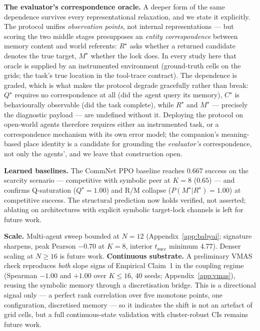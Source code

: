 \documentclass{article}
\begin{document}
\textbf{The evaluator's correspondence oracle.} A deeper form of the
same dependence survives every representational relaxation, and we
state it explicitly. The protocol unifies \emph{observation points},
not internal representations --- but scoring the two middle stages
presupposes an \emph{entity correspondence} between memory content and
world referents: $R^\star$ asks whether a returned candidate denotes
the true target, $M^\star$ whether the lock does. In every study here
that oracle is supplied by an instrumented environment (ground-truth
cells on the grids; the task's true location in the tool-trace
contract). The dependence is graded, which is what makes the protocol
degrade gracefully rather than break: $Q^\star$ requires no
correspondence at all (did the agent query its memory), $C^\star$ is
behaviourally observable (did the task complete), while $R^\star$ and
$M^\star$ --- precisely the diagnostic payload --- are undefined
without it. Deploying the protocol on open-world agents therefore
requires either an instrumented task, or a correspondence mechanism
with its own error model; the companion's meaning-based place identity
is a candidate for grounding the \emph{evaluator's} correspondence,
not only the agents', and we leave that construction open.

\textbf{Learned baselines.} The CommNet PPO baseline reaches $0.667$ success on the scarcity scenario --- competitive with symbolic peer at $K{=}8$ ($0.65$) --- and confirms Q-saturation ($Q^\star{=}1.00$) and R/M collapse ($P(M^\star|R^\star){=}1.00$) at competitive success. The structural prediction now holds verified, not asserted; ablating on architectures with explicit symbolic target-lock channels is left for future work.

\textbf{Scale.} Multi-agent sweep bounded at $N{=}12$ (Appendix~\ref{app:babyai}; signature sharpens, peak Pearson $-0.70$ at $K{=}8$, interior $t_{\mathrm{succ}}$ minimum $4.77$). Denser scaling at $N{\ge}16$ is future work.
\textbf{Continuous substrate.} A preliminary VMAS~\citep{bettini2022vmas} check reproduces \emph{both} slope signs of Empirical Claim~1 in the coupling regime (Spearman $-1.00$ and $+1.00$ over $K{\le}16$, 40 seeds; Appendix~\ref{app:vmas}), reusing the symbolic memory through a discretisation bridge. This is a directional signal only --- a perfect rank correlation over five monotone points, one configuration, discretised memory --- so it indicates the shift is not an artefact of grid cells, but a full continuous-state validation with cluster-robust CIs remains future work.
\end{document}
